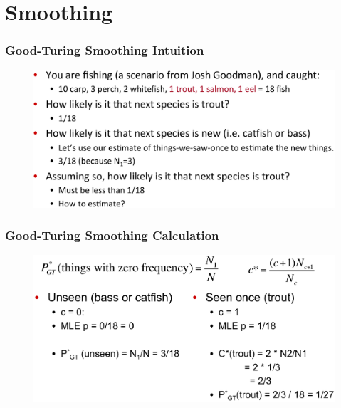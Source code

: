 \documentclass{beamer}
\begin{document}
\section{Smoothing}


\begin{frame}\frametitle{Good-Turing Smoothing Intuition}
\begin{figure}
\includegraphics[width=1\linewidth]{figure/good_turing_smoothing.pdf}
\label{fig:good_turing_smoothing}
\end{figure}
\end{frame}


\begin{frame}\frametitle{Good-Turing Smoothing Calculation}
\begin{figure}
\includegraphics[width=0.9\linewidth]{figure/good_turing_calculation.pdf}
\label{fig:good_turing_calculation}
\end{figure}
\end{frame}
\end{document}
